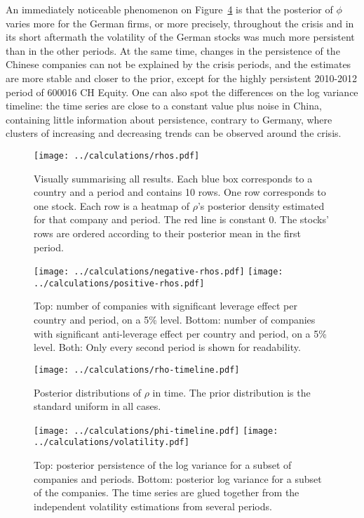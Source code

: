 An immediately noticeable phenomenon on Figure~\ref{fig:persistence} is that the posterior of $\phi$ varies more for the German firms, or more precisely, throughout the crisis and in its short aftermath the volatility of the German stocks was much more persistent than in the other periods.
At the same time, changes in the persistence of the Chinese companies can not be explained by the crisis periods, and the estimates are more stable and closer to the prior, except for the highly persistent 2010-2012 period of 600016 CH Equity.
One can also spot the differences on the log variance timeline: the time series are close to a constant value plus noise in China, containing little information about persistence, contrary to Germany, where clusters of increasing and decreasing trends can be observed around the crisis.

\begin{figure}[p]
	\vspace*{-3.2cm}
	\centering
	\texttt{[image: ../calculations/rhos.pdf]}
	\caption[Visually summarising all results]{Visually summarising all results. Each blue box corresponds to a country and a period and contains 10 rows. One row corresponds to one stock. Each row is a heatmap of $\rho$'s posterior density estimated for that company and period. The red line is constant 0. The stocks' rows are ordered according to their posterior mean in the first period.}
	\label{fig:rhos}
\end{figure}

\begin{figure}[p]
	\vspace*{-3.2cm}
	\centering
	\texttt{[image: ../calculations/negative-rhos.pdf]}
	\texttt{[image: ../calculations/positive-rhos.pdf]}
	\caption[Significant leverage effect]{Top: number of companies with significant leverage effect per country and period, on a 5\% level. Bottom: number of companies with significant anti-leverage effect per country and period, on a 5\% level. Both: Only every second period is shown for readability.}
	\label{fig:negative-rhos}
\end{figure}

\begin{figure}[p]
	\vspace*{-3.2cm}
	\centering
	\texttt{[image: ../calculations/rho-timeline.pdf]}
	\caption[Timeline of posterior $\rho$]{Posterior distributions of $\rho$ in time. The prior distribution is the standard uniform in all cases.}
	\label{fig:company-rhos}
\end{figure}

\begin{figure}[p]
	\vspace*{-3.2cm}
	\centering
	\texttt{[image: ../calculations/phi-timeline.pdf]}
	\texttt{[image: ../calculations/volatility.pdf]}
	\caption[Timeline of persistence and volatility]{Top: posterior persistence of the log variance for a subset of companies and periods. Bottom: posterior log variance for a subset of the companies. The time series are glued together from the independent volatility estimations from several periods.}
	\label{fig:persistence}
\end{figure}
